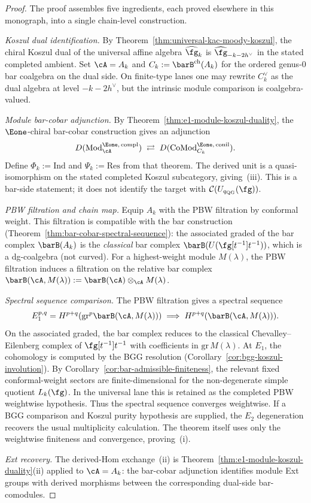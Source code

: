 \begin{proof}
The proof assembles five ingredients, each proved elsewhere in this
monograph, into a single chain-level construction.

\emph{Koszul dual identification.}
By Theorem~\ref{thm:universal-kac-moody-koszul}, the chiral Koszul
dual of the universal affine algebra $\widehat{\fg}_k$ is
$\widehat{\fg}_{-k-2h^\vee}$ in the stated completed ambient. Set
$\cA = A_k$ and
$C_k := \barB^{\mathrm{ch}}(A_k)$ for the ordered
genus-$0$ bar coalgebra on the dual side. On finite-type lanes one may
rewrite $C_k^\vee$ as the dual algebra at level $-k-2h^\vee$, but the
intrinsic module comparison is coalgebra-valued.

\emph{Module bar-cobar adjunction.}
By Theorem~\ref{thm:e1-module-koszul-duality}, the $\Eone$-chiral
bar-cobar construction gives an adjunction
\[
D(\mathrm{Mod}^{\Eone,\,\mathrm{compl}}_{\cA})
\;\rightleftarrows\;
D(\mathrm{CoMod}^{\Eone,\,\mathrm{conil}}_{C_k}).
\]
Define $\Phi_k := \mathrm{Ind}$ and $\Psi_k := \mathrm{Res}$ from
that theorem. The derived unit is a quasi-isomorphism on the stated
completed Koszul subcategory, giving~(iii). This is a
bar-side statement; it does not identify the target with
$\mathcal C(U_{q_{\mathrm{QG}}}(\fg))$.

\emph{PBW filtration and chain map.}
Equip $A_k$ with the PBW filtration by conformal weight.
This filtration is compatible with the bar construction
(Theorem~\ref{thm:bar-cobar-spectral-sequence}): the associated
graded of the bar complex $\barB(A_k)$ is the
\emph{classical} bar complex $\barB(U(\fg[t^{-1}]t^{-1}))$, which
is a dg-coalgebra (not curved). For a highest-weight module
$M(\lambda)$, the PBW filtration induces a filtration on the
relative bar complex
$\barB(\cA, M(\lambda)) := \barB(\cA) \otimes_{\cA} M(\lambda)$.

\emph{Spectral sequence comparison.}
The PBW filtration gives a spectral sequence
\[
E_1^{p,q} = H^{p+q}(\mathrm{gr}^p \barB(\cA, M(\lambda)))
\;\Longrightarrow\;
H^{p+q}(\barB(\cA, M(\lambda))).
\]
On the associated graded, the bar complex reduces to the classical
Chevalley--Eilenberg complex of $\fg[t^{-1}]t^{-1}$ with
coefficients in $\mathrm{gr}\, M(\lambda)$. At $E_1$, the
cohomology is computed by the BGG resolution
(Corollary~\ref{cor:bgg-koszul-involution}).
By Corollary~\ref{cor:bar-admissible-finiteness}, the relevant fixed
conformal-weight sectors are finite-dimensional for the
non-degenerate simple quotient $L_k(\fg)$. In the universal lane this
is retained as the completed PBW weightwise hypothesis. Thus the
spectral sequence converges weightwise. If a BGG comparison and
Koszul purity hypothesis are supplied, the $E_2$ degeneration recovers
the usual multiplicity calculation. The theorem itself uses only the
weightwise finiteness and convergence, proving~(i).

\emph{Ext recovery.}
The derived-Hom exchange~(ii) is
Theorem~\ref{thm:e1-module-koszul-duality}(ii) applied to
$\cA = A_k$: the bar-cobar adjunction identifies module
Ext groups with derived morphisms between the corresponding dual-side
bar-comodules.
\end{proof}

